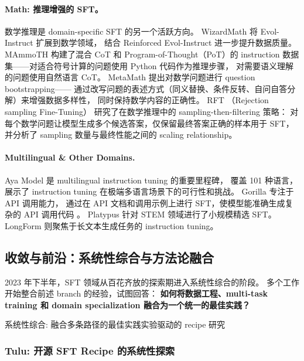 \paragraph{Math: 推理增强的 SFT。}
数学推理是 domain-specific SFT 的另一个活跃方向。
WizardMath \citep{luo2023wizardmath} 将 Evol-Instruct 扩展到数学领域，
结合 Reinforced Evol-Instruct 进一步提升数据质量。
MAmmoTH \citep{yue2023mammoth} 构建了混合 CoT 和 Program-of-Thought（PoT）的
instruction 数据集——对适合符号计算的问题使用 Python 代码作为推理步骤，
对需要语义理解的问题使用自然语言 CoT。
MetaMath \citep{yu2023metamath} 提出对数学问题进行 question bootstrapping——
通过改写问题的表述方式（同义替换、条件反转、自问自答分解）来增强数据多样性，
同时保持数学内容的正确性。
RFT \citep{yuan2023rft}（Rejection sampling Fine-Tuning）
研究了在数学推理中的 sampling-then-filtering 策略：
对每个数学问题让模型生成多个候选答案，仅保留最终答案正确的样本用于 SFT，
并分析了 sampling 数量与最终性能之间的 scaling relationship。

\paragraph{Multilingual \& Other Domains.}
Aya Model \citep{ustun2024aya} 是 multilingual instruction tuning 的重要里程碑，
覆盖 101 种语言，展示了 instruction tuning 在极端多语言场景下的可行性和挑战。
Gorilla \citep{patil2023gorilla} 专注于 API 调用能力，
通过在 API 文档和调用示例上进行 SFT，使模型能准确生成复杂的 API 调用代码
。
Platypus \citep{lee2023platypus} 针对 STEM 领域进行了小规模精选 SFT。
LongForm \citep{koksal2023longform} 则聚焦于长文本生成任务的 instruction tuning。


\subsection{收敛与前沿：系统性综合与方法论融合}
\label{sec:t1-convergence}

2023 年下半年，SFT 领域从百花齐放的探索期进入系统性综合的阶段。
多个工作开始整合前述 branch 的经验，试图回答：
\textbf{如何将数据工程、multi-task training 和 domain specialization
融合为一个统一的最佳实践？}

%
  {系统性综合: 融合多条路径的最佳实践}{实验驱动的 recipe 研究}


\subsubsection{Tulu: 开源 SFT Recipe 的系统性探索}
\label{sec:t1-tulu}


